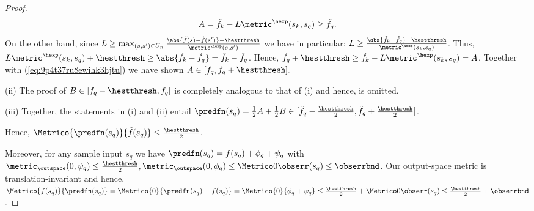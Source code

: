 \begin{lem}
\begin{proof}
\begin{equation} 
A=\tilde f_k - L \metric^\hexp(s_k,s_q) \geq \tilde f_q. \label{eq:9p4t37ru8ewihk3hjtu}
\end{equation} 
On the other hand, since $L  \geq  \max_{(s,s') \in U_n} \frac{\abs{\tilde f(s)-\tilde f(s')} - \hestthresh}{\metric^\hexp(s,s')}$  we have in particular: $L  \geq  \frac{ \abs{\tilde f_k- \tilde f_q}-\hestthresh }{\metric^\hexp(s_k,s_q)}$. Thus,  
 $L \metric^\hexp(s_k,s_q) + \hestthresh \geq \abs{\tilde f_k-\tilde f_q} = \tilde f_k - \tilde f_q$. Hence, $\tilde f_q + \hestthresh \geq \tilde f_k - L \metric^\hexp(s_k,s_q) = A$. 
 Together with (\ref{eq:9p4t37ru8ewihk3hjtu}) we have shown $A \in [\tilde f_q , \tilde f_q +\hestthresh].$
% 

(ii) The proof of \underline{$B \in [ \tilde f_q - \hestthresh, \tilde f_q]$} is completely analogous to that of (i) and hence, is omitted.

(iii) Together, the statements in (i) and (ii)  entail  $\predfn(s_q) = \frac 1 2 A + \frac 1 2 B  \in [\tilde f_q - \frac \hestthresh 2, \tilde f_q + \frac \hestthresh 2]$.

Hence, $\Metrico{\predfn(s_q)}{\tilde f(s_q)} \leq \frac \hestthresh 2$.

Moreover, for any sample input $s_q$ we have $\predfn(s_q) = f(s_q) + \phi_q + \psi_q$ with $\metric_{\outspace}(0,\psi_q) \leq \frac \hestthresh 2,  \metric_{\outspace}(0,\phi_q) \leq \Metrico 0 {\obserr(s_q)} \leq \obserrbnd$. 
Our output-space metric is translation-invariant and hence, $\Metrico{f(s_q)}{\predfn(s_q)} = \Metrico{0}{\predfn(s_q)- f(s_q)} = \Metrico{0}{  \phi_q + \psi_q} \leq \frac \hestthresh 2 +\Metrico 0 {\obserr(s_q)} \leq \frac \hestthresh 2 + \obserrbnd$.
\end{proof}
\end{lem}
